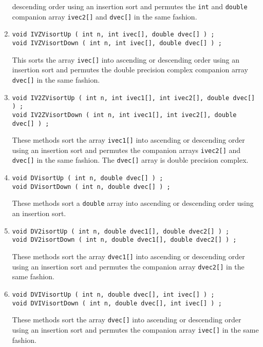 \begin{enumerate}
descending order using an insertion sort and permutes 
the {\tt int} and {\tt double} companion array
{\tt ivec2[]} and {\tt dvec[]} in the same fashion.
\item
\begin{verbatim}
void IVZVisortUp ( int n, int ivec[], double dvec[] ) ;
void IVZVisortDown ( int n, int ivec[], double dvec[] ) ;
\end{verbatim}
This sorts the array {\tt ivec[]} into ascending or descending order 
using an insertion sort and permutes the double precision complex
companion array {\tt dvec[]} in the same fashion.
\item
\begin{verbatim}
void IV2ZVisortUp ( int n, int ivec1[], int ivec2[], double dvec[] ) ;
void IV2ZVisortDown ( int n, int ivec1[], int ivec2[], double dvec[] ) ;
\end{verbatim}
These methods sort the array {\tt ivec1[]} into ascending 
or descending order 
using an insertion sort and permutes the companion arrays
{\tt ivec2[]} and {\tt dvec[]} in the same fashion.
The {\tt dvec[]} array is double precision complex.
\item
\begin{verbatim}
void DVisortUp ( int n, double dvec[] ) ;
void DVisortDown ( int n, double dvec[] ) ;
\end{verbatim}
These methods sort a {\tt double} array into ascending 
or descending order using an insertion sort.
\item
\begin{verbatim}
void DV2isortUp ( int n, double dvec1[], double dvec2[] ) ;
void DV2isortDown ( int n, double dvec1[], double dvec2[] ) ;
\end{verbatim}
These methods sort the array {\tt dvec1[]} into ascending or
descending order 
using an insertion sort and permutes the companion array {\tt dvec2[]}
in the same fashion.
\item
\begin{verbatim}
void DVIVisortUp ( int n, double dvec[], int ivec[] ) ;
void DVIVisortDown ( int n, double dvec[], int ivec[] ) ;
\end{verbatim}
These methods sort the array {\tt dvec[]} into ascending or
descending order using an insertion sort and permutes 
the companion array {\tt ivec[]} in the same fashion.
\end{enumerate}
\par
